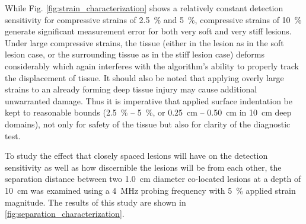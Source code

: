 			While Fig. \ref{fig:strain_characterization} shows a relatively constant detection sensitivity for compressive strains of \SI{2.5}{\percent} and \SI{5}{\percent}, compressive strains of \SI{10}{\percent} generate significant measurement error for both very soft and very stiff lesions. Under large compressive strains, the tissue (either in the lesion as in the soft lesion case, or the surrounding tissue as in the stiff lesion case) deforms considerably which again interferes with the algorithm's ability to properly track the displacement of tissue. It should also be noted that applying overly large strains to an already forming deep tissue injury may cause additional unwarranted damage. Thus it is imperative that applied surface indentation be kept to reasonable bounds (\SI{2.5}{\percent} -- \SI{5}{\percent}, or \SI{0.25}{\cm} -- \SI{0.50}{\cm} in \SI{10}{\cm} deep domains), not only for safety of the tissue but also for clarity of the diagnostic test.

			To study the effect that closely spaced lesions will have on the detection sensitivity as well as how discernible the lesions will be from each other, the separation distance between two \SI{1.0}{\cm} diameter co-located lesions at a depth of \SI{10}{\cm} was examined using a \SI{4}{\MHz} probing frequency with \SI{5}{\percent} applied strain magnitude. The results of this study are shown in \ref{fig:separation_characterization}.

